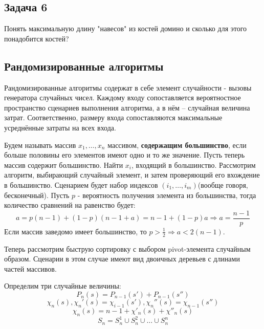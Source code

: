\documentclass[11pt]{article}
\begin{document}
\subsection{Задача 6}
\label{sec:org26fbfd5}
Понять максимальную длину "навесов" из костей домино и сколько для этого понадобится костей?
\subsection{Рандомизированные алгоритмы}
\label{sec:orgccdd17a}
Рандомизированные алгоритмы содержат в себе элемент случайности - вызовы генератора случайных
чисел. Каждому входу сопоставляется вероятностное пространство сценариев выполнения алгоритма,
а в нём -- случайная величина затрат. Соответственно, размеру входа сопоставляются максимальные
усреднённые затраты на всех входа.

Будем называть массив \(x_1, \ldots, x_n\) массивом, \textbf{содержащим большинство}, если больше
половины его элементов имеют одно и то же значение. Пусть теперь массив содержит большинство.
Найти \(x_i\), входящий в большинство. Рассмотрим алгоритм, выбирающий случайный элемент, и
затем проверяющий его вхождение в большинство. Сценарием будет набор индексов
\((i_1, \ldots, i_m)\)(вообще говоря, бесконечный). Пусть \(p\) - вероятность получения элемента
из большинства, тогда количество сравнений на равенство будет:
\begin{equation}
a = p(n - 1) + (1 - p)(n - 1 + a) = n - 1 + (1 - p)a \Rightarrow a = \frac{n - 1}{p}
\end{equation}
Если массив заведомо имеет большинство, то $p > \frac12 \Rightarrow a < 2(n - 1)$.

Теперь рассмотрим быструю сортировку с выбором pivot-элемента случайным образом. Сценарии в
этом случае имеют вид двоичных деревьев с длинами частей массивов.

Определим три случайные величины:
\begin{equation}
P_n(s) = P_{n - 1}(s') + P_{n - 1}(s'')
\end{equation}
\begin{equation}
\chi_n(s), \chi_n'(s) = \chi_{i - 1}(s'), \chi_n''(s) = \chi_{n - 1}(s'')
\end{equation}
\begin{equation}
\chi_n(s) = n - 1 + \chi'_n(s) + \chi''_n(s)
\end{equation}
\begin{equation}
S_n = S^1_n \cup S^2_n \cup \ldots \cup S^n_n
\end{equation}
\end{document}
